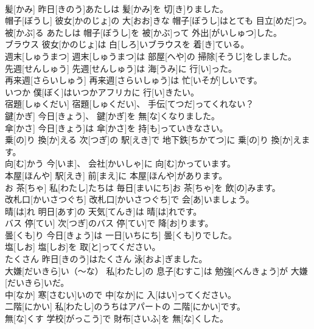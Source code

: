 \documentclass[8pt]{extreport}
\begin{document}
\begin{CJK}{UTF8}{min}
\\	髪[かみ]	昨日[きのう]あたしは 髪[かみ]を 切[き]りました。		
\\	帽子[ぼうし]	彼女[かのじょ]の 大[おお]きな 帽子[ぼうし]はとても 目立[めだ]つ。		
\\	被[かぶ]る	あたしは 帽子[ぼうし]を 被[かぶ]って 外出[がいしゅつ]した。		
\\	ブラウス	彼女[かのじょ]は 白[しろ]いブラウスを 着[き]ている。		
\\	週末[しゅうまつ]	週末[しゅうまつ]は 部屋[へや]の 掃除[そうじ]をしました。		
\\	先週[せんしゅう]	先週[せんしゅう]は 海[うみ]に 行[い]った。		
\\	再来週[さらいしゅう]	再来週[さらいしゅう]は 忙[いそが]しいです。		
\\	いつか	僕[ぼく]はいつかアフリカに 行[い]きたい。		
\\	宿題[しゅくだい]	宿題[しゅくだい]、 手伝[てつだ]ってくれない？		
\\	鍵[かぎ]	今日[きょう]、 鍵[かぎ]を 無[な]くなりました。		
\\	傘[かさ]	今日[きょう]は 傘[かさ]を 持[も]っていきなさい。		
\\	乗[の]り 換[か]える	次[つぎ]の 駅[えき]で 地下鉄[ちかてつ]に 乗[の]り 換[か]えます。		
\\	向[む]かう	今[いま]、 会社[かいしゃ]に 向[む]かっています。		
\\	本屋[ほんや]	駅[えき] 前[まえ]に 本屋[ほんや]があります。		
\\	お 茶[ちゃ]	私[わたし]たちは 毎日[まいにち]お 茶[ちゃ]を 飲[の]みます。		
\\	改札口[かいさつぐち]	改札口[かいさつぐち]で 会[あ]いましょう。		
\\	晴[は]れ	明日[あす]の 天気[てんき]は 晴[は]れです。		
\\	バス 停[てい]	次[つぎ]のバス 停[てい]で 降[お]ります。		
\\	曇[くも]り	今日[きょう]は 一日[いちにち] 曇[くも]りでした。		
\\	塩[しお]	塩[しお]を 取[と]ってください。		
\\	たくさん	昨日[きのう]はたくさん 泳[およ]ぎました。		
\\	大嫌[だいきら]い（～な）	私[わたし]の 息子[むすこ]は 勉強[べんきょう]が 大嫌[だいきら]いだ。		
\\	中[なか]	寒[さむい]いので 中[なか]に 入[はい]ってください。		
\\	二階[にかい]	私[わたし]のうちはアパートの 二階[にかい]です。		
\\	無[な]くす	学校[がっこう]で 財布[さいふ]を 無[な]くした。		

\end{CJK}
\end{document}
